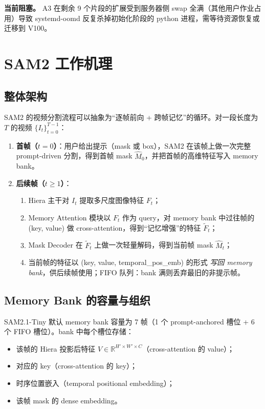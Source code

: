 \documentclass[11pt,a4paper]{ctexart}
\begin{document}
\textbf{当前阻塞。} A3 在剩余 9 个片段的扩展受到服务器侧 swap 全满（其他用户作业占用）导致 systemd-oomd 反复杀掉初始化阶段的 python 进程，需等待资源恢复或迁移到 V100。

\section{SAM2 工作机理}
\label{sec:sam2}

\subsection{整体架构}

SAM2 的视频分割流程可以抽象为``逐帧前向 + 跨帧记忆''的循环。对一段长度为 $T$ 的视频 $\{I_t\}_{t=0}^{T-1}$：

\begin{enumerate}[leftmargin=2em]
    \item \textbf{首帧（$t=0$）}：用户给出提示（mask 或 box），SAM2 在该帧上做一次完整 prompt-driven 分割，得到首帧 mask $\hat{M}_0$，并把首帧的高维特征写入 memory bank。
    \item \textbf{后续帧（$t \geq 1$）}：
    \begin{enumerate}[leftmargin=1.5em]
        \item Hiera 主干对 $I_t$ 提取多尺度图像特征 $F_t$；
        \item Memory Attention 模块以 $F_t$ 作为 query，对 memory bank 中过往帧的 (key, value) 做 cross-attention，得到``记忆增强''的特征 $\tilde{F}_t$；
        \item Mask Decoder 在 $\tilde{F}_t$ 上做一次轻量解码，得到当前帧 mask $\hat{M}_t$；
        \item 当前帧的特征以 (key, value, temporal\_pos\_emb) 的形式 \emph{写回 memory bank}，供后续帧使用；FIFO 队列：bank 满则丢弃最旧的非提示帧。
    \end{enumerate}
\end{enumerate}

\subsection{Memory Bank 的容量与组织}

SAM2.1-Tiny 默认 memory bank 容量为 7 帧（1 个 prompt-anchored 槽位 + 6 个 FIFO 槽位）。bank 中每个槽位存储：
\begin{itemize}[leftmargin=2em]
    \item 该帧的 Hiera 投影后特征 $V \in \mathbb{R}^{H' \times W' \times C}$（cross-attention 的 value）；
    \item 对应的 key（cross-attention 的 key）；
    \item 时序位置嵌入（temporal positional embedding）；
    \item 该帧 mask 的 dense embedding。
\end{itemize}
\end{document}
